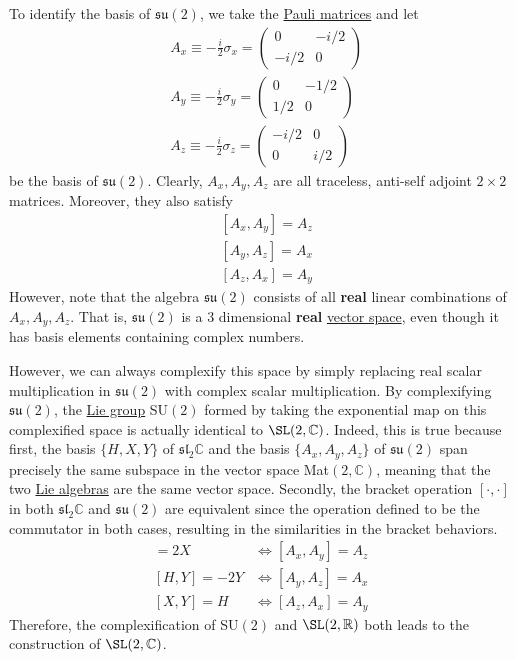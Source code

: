   To identify the basis of $\mathfrak{su}(2)$, we take the \hyperref[def:pauli-matrices]{Pauli matrices} and let 
  \begin{align*}
    & A_x \equiv - \frac{i}{2} \sigma_x = \begin{pmatrix} 0&-i/2\\-i/2&0 \end{pmatrix} \\
    & A_y \equiv - \frac{i}{2} \sigma_y = \begin{pmatrix}0&-1/2\\1/2&0\end{pmatrix} \\
    & A_z \equiv -\frac{i}{2} \sigma_z = \begin{pmatrix}-i/2&0\\0&i/2\end{pmatrix}
  \end{align*} 
  be the basis of $\mathfrak{su}(2)$. Clearly, $A_x, A_y, A_z$ are all traceless, anti-self adjoint $2 \times 2$ matrices. Moreover, they also satisfy
  \begin{align*}
    & [A_x, A_y] = A_z \\
    & [A_y, A_z] = A_x \\
    & [A_z, A_x] = A_y
  \end{align*}
  However, note that the algebra $\mathfrak{su}(2)$ consists of all \textbf{real} linear combinations of $A_x, A_y, A_z$. That is, $\mathfrak{su}(2)$ is a 3 dimensional \textbf{real} \hyperref[def:vector-space]{vector space}, even though it has basis elements containing complex numbers. 

  However, we can always complexify this space by simply replacing real scalar multiplication in $\mathfrak{su}(2)$ with complex scalar multiplication. By complexifying $\mathfrak{su}(2)$, the \hyperref[def:lie-group]{Lie group} SU$(2)$ formed by taking the exponential map on this complexified space is actually identical to $\SL(2, \mathbb{C})$. Indeed, this is true because first, the basis $\{H, X, Y\}$ of $\mathfrak{sl}_2 \mathbb{C}$ and the basis $\{A_x, A_y, A_z\}$ of $\mathfrak{su}(2)$ span precisely the same subspace in the vector space Mat$(2, \mathbb{C})$, meaning that the two \hyperref[def:lie-algebra]{Lie algebras} are the same vector space. Secondly, the bracket operation $[\cdot, \cdot]$ in both $\mathfrak{sl}_2 \mathbb{C}$ and $\mathfrak{su}(2)$ are equivalent since the operation defined to be the commutator in both cases, resulting in the similarities in the bracket behaviors. 
  \begin{align*}
    [H,X] = 2X & \iff [A_x, A_y] = A_z \\
    [H,Y] = - 2Y & \iff [A_y, A_z] = A_x\\
    [X,Y] = H & \iff  [A_z, A_x] = A_y 
  \end{align*}
  Therefore, the complexification of SU$(2)$ and $\SL(2, \mathbb{R})$ both leads to the construction of $\SL(2, \mathbb{C})$. 

